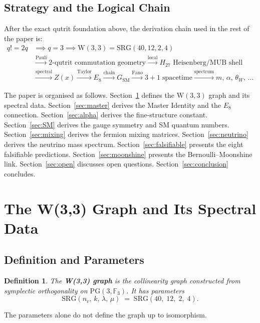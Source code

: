 \documentclass[12pt,a4paper]{article}
\newtheorem{definition}[theorem]{Definition}
\newcommand{\W}{\mathrm{W}(3,3)}
\newcommand{\SRG}{\mathrm{SRG}}
\newcommand{\Eone}{E_8}
\newcommand{\nv}{n_{\!v}}
\begin{document}
\subsection{Strategy and the Logical Chain}

After the exact qutrit foundation above, the derivation chain used in the rest
of the paper is:
\begin{equation}\label{eq:chain}
\begin{aligned}
  q!=2q &\implies q=3 \implies \W = \SRG(40,12,2,4) \\
        &\xrightarrow{\mathrm{Pauli}} \text{2-qutrit commutation geometry}
         \xrightarrow{\mathrm{local}} H_{27}\text{ Heisenberg/MUB shell} \\
        &\xrightarrow{\mathrm{spectral}} Z(x)
         \xrightarrow{\mathrm{Taylor}} E_8
         \xrightarrow{\mathrm{chain}} G_{\mathrm{SM}}
         \xrightarrow{\mathrm{Fano}} 3\!+\!1\;\text{spacetime}
         \xrightarrow{\mathrm{spectrum}} m,\,\alpha,\,\theta_W,\,\ldots
\end{aligned}
\end{equation}

The paper is organised as follows. Section~\ref{sec:graph} defines
the $\W$ graph and its spectral data. Section~\ref{sec:master}
derives the Master Identity and the $\Eone$ connection.
Section~\ref{sec:alpha} derives the fine-structure constant.
Section~\ref{sec:SM} derives the gauge symmetry and SM quantum
numbers. Section~\ref{sec:mixing} derives the fermion mixing
matrices. Section~\ref{sec:neutrino} derives the neutrino mass
spectrum. Section~\ref{sec:falsifiable} presents the eight
falsifiable predictions. Section~\ref{sec:moonshine} presents the
Bernoulli--Moonshine link. Section~\ref{sec:open} discusses open
questions. Section~\ref{sec:conclusion} concludes.

\section{The W(3,3) Graph and Its Spectral Data}
\label{sec:graph}

\subsection{Definition and Parameters}

\begin{definition}
The \textbf{W(3,3) graph} is the collinearity graph constructed from
symplectic orthogonality on $\mathrm{PG}(3,\mathbb F_3)$.  It has parameters
\[
  \SRG(\nv,\,k,\,\lambda,\,\mu)
  \;=\;
  \SRG(40,\;12,\;2,\;4).
\]
\end{definition}
The parameters alone do not define the graph up to isomorphism.
\end{document}
